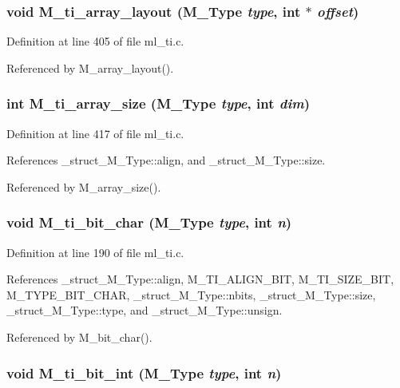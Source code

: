 \subsubsection{\setlength{\rightskip}{0pt plus 5cm}void M\_\-ti\_\-array\_\-layout (\bf{M\_\-Type} {\em type}, int $\ast$ {\em offset})}\label{ml__ti_8c_6d11f943ead088d249d81176f6abfc49}




Definition at line 405 of file ml\_\-ti.c.

Referenced by M\_\-array\_\-layout().
\subsubsection{\setlength{\rightskip}{0pt plus 5cm}int M\_\-ti\_\-array\_\-size (\bf{M\_\-Type} {\em type}, int {\em dim})}\label{ml__ti_8c_ad0eb837b512262771ac1abd03d4d5df}




Definition at line 417 of file ml\_\-ti.c.

References \_\-struct\_\-M\_\-Type::align, and \_\-struct\_\-M\_\-Type::size.

Referenced by M\_\-array\_\-size().
\subsubsection{\setlength{\rightskip}{0pt plus 5cm}void M\_\-ti\_\-bit\_\-char (\bf{M\_\-Type} {\em type}, int {\em n})}\label{ml__ti_8c_9e66e626af7942131a48194624bd721e}




Definition at line 190 of file ml\_\-ti.c.

References \_\-struct\_\-M\_\-Type::align, M\_\-TI\_\-ALIGN\_\-BIT, M\_\-TI\_\-SIZE\_\-BIT, M\_\-TYPE\_\-BIT\_\-CHAR, \_\-struct\_\-M\_\-Type::nbits, \_\-struct\_\-M\_\-Type::size, \_\-struct\_\-M\_\-Type::type, and \_\-struct\_\-M\_\-Type::unsign.

Referenced by M\_\-bit\_\-char().
\subsubsection{\setlength{\rightskip}{0pt plus 5cm}void M\_\-ti\_\-bit\_\-int (\bf{M\_\-Type} {\em type}, int {\em n})}\label{ml__ti_8c_135f27fb35b9a0e08734f682ad2cdc2b}




